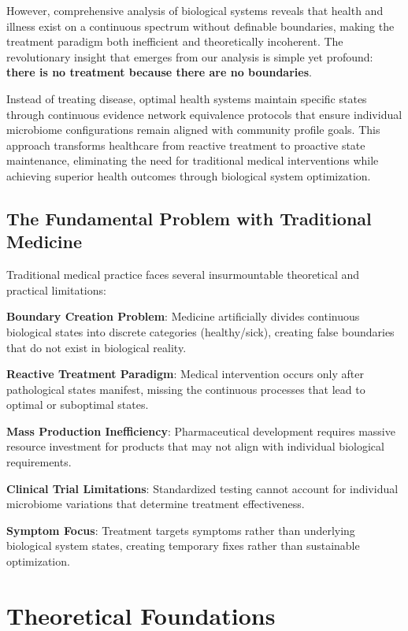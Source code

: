 \documentclass[12pt,a4paper]{article}
\begin{document}
However, comprehensive analysis of biological systems reveals that health and illness exist on a continuous spectrum without definable boundaries, making the treatment paradigm both inefficient and theoretically incoherent. The revolutionary insight that emerges from our analysis is simple yet profound: \textbf{there is no treatment because there are no boundaries}.

Instead of treating disease, optimal health systems maintain specific states through continuous evidence network equivalence protocols that ensure individual microbiome configurations remain aligned with community profile goals. This approach transforms healthcare from reactive treatment to proactive state maintenance, eliminating the need for traditional medical interventions while achieving superior health outcomes through biological system optimization.

\subsection{The Fundamental Problem with Traditional Medicine}

Traditional medical practice faces several insurmountable theoretical and practical limitations:

\textbf{Boundary Creation Problem}: Medicine artificially divides continuous biological states into discrete categories (healthy/sick), creating false boundaries that do not exist in biological reality.

\textbf{Reactive Treatment Paradigm}: Medical intervention occurs only after pathological states manifest, missing the continuous processes that lead to optimal or suboptimal states.

\textbf{Mass Production Inefficiency}: Pharmaceutical development requires massive resource investment for products that may not align with individual biological requirements.

\textbf{Clinical Trial Limitations}: Standardized testing cannot account for individual microbiome variations that determine treatment effectiveness.

\textbf{Symptom Focus}: Treatment targets symptoms rather than underlying biological system states, creating temporary fixes rather than sustainable optimization.

\section{Theoretical Foundations}
\end{document}
